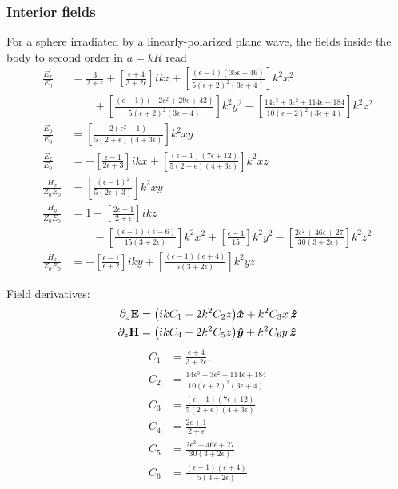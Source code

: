 \documentclass[letterpaper]{article}
\begin{document}
\subsubsection*{Interior fields }

For a sphere irradiated by a linearly-polarized plane wave,
the fields inside the body to second order in $a=kR$ read
\begin{align*}
 \frac{E_x}{E_0} &= \frac{3}{2+\epsilon} 
        +\left[\frac{\epsilon+4}{3+2\epsilon}\right] ikz
  +\left[\frac{(\epsilon-1)(35\epsilon+46)}
              {5(\epsilon+2)^2 (3 \epsilon+4)}
   \right]k^2 x^2
\\[5pt]
&\qquad
  +\left[\frac{(\epsilon-1)(-2\epsilon^2+29\epsilon+42)}
              {5(\epsilon+2)^2 (3 \epsilon+4)}
   \right]k^2 y^2
  -\left[\frac{14\epsilon^3 + 3\epsilon^2 + 114\epsilon + 184}
              {10(\epsilon+2)^2 (3 \epsilon+4)}
   \right]k^2 z^2
\\[5pt]
 \frac{E_y}{E_0} 
 &= \left[\frac{2(\epsilon^2-1)}{5(2+\epsilon)(4+3\epsilon)}\right] k^2 xy
\\
 \frac{E_z}{E_0} &= -\left[\frac{\epsilon-1}{2\epsilon+3}\right] ikx
        +\left[\frac{(\epsilon-1)(7\epsilon+12)}
                    {5(2+\epsilon)(4+3\epsilon)}
        \right]k^2 xz
\\[5pt]
 \frac{H_x}{Z_0 E_0} 
 &= \left[\frac{(\epsilon-1)^2}{5(2\epsilon+3)}\right] k^2 xy
\\[5pt]
 \frac{H_y}{Z_0 E_0} 
  &= 1 + \left[\frac{2\epsilon+1}{2+\epsilon}\right] ikz
\\[5pt]
&\qquad - \left[\frac{(\epsilon-1)(\epsilon-6)}{15(3+2\epsilon)}\right]k^2 x^2
        + \left[\frac{\epsilon-1}{15}\right]k^2 y^2 
        - \left[\frac{2\epsilon^2 + 46\epsilon + 27}{30(3+2\epsilon)}
          \right]k^2 z^2
\\
 \frac{H_z}{Z_0 E_0} 
     &= -\left[\frac{\epsilon-1}{\epsilon+2}\right] iky
        +\left[\frac{(\epsilon-1)(\epsilon+4)}
                    {5(3+2\epsilon)}\right] k^2 yz
\end{align*}

Field derivatives:
\begin{align*}
 \partial_z \mathbf{E} &= \big(ikC_1 - 2k^2 C_2 z\big)\boldsymbol{\hat{x}} 
                     +k^2 C_3 x\,\boldsymbol{\hat{z}}
\\
 \partial_z \mathbf{H} &= \big(ik C_4 - 2k^2 C_5 z\big) \boldsymbol{\hat{y}}
                     +k^2 C_6 y\,\boldsymbol{\hat{z}}
\end{align*}
\begin{align*}
 C_1 &= \frac{\epsilon+4}{3+2\epsilon},
\\
 C_2 &= \frac{14\epsilon^3 + 3\epsilon^2 + 114\epsilon + 184}
             {10(\epsilon+2)^2 (3 \epsilon+4)}
\\
 C_3 &= \frac{(\epsilon-1)(7\epsilon+12)}{5(2+\epsilon)(4+3\epsilon)}
\\
C_4 &= \frac{2\epsilon+1}{2+\epsilon}
\\
C_5 &= \frac{2\epsilon^2 + 46\epsilon + 27}{30(3+2\epsilon)}
\\
C_6 &= \frac{(\epsilon-1)(\epsilon+4)} {5(3+2\epsilon)}
\end{align*}
\end{document}
